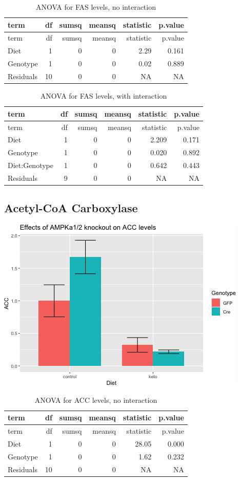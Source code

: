 \documentclass[]{article}
\begin{document}
\begin{longtable}[]{@{}lrrrrr@{}}
\caption{ANOVA for FAS levels, no interaction}\tabularnewline
\toprule
term & df & sumsq & meansq & statistic & p.value\tabularnewline
\midrule
\endfirsthead
\toprule
term & df & sumsq & meansq & statistic & p.value\tabularnewline
\midrule
\endhead
Diet & 1 & 0 & 0 & 2.29 & 0.161\tabularnewline
Genotype & 1 & 0 & 0 & 0.02 & 0.889\tabularnewline
Residuals & 10 & 0 & 0 & NA & NA\tabularnewline
\bottomrule
\end{longtable}

\begin{longtable}[]{@{}lrrrrr@{}}
\caption{ANOVA for FAS levels, with interaction}\tabularnewline
\toprule
term & df & sumsq & meansq & statistic & p.value\tabularnewline
\midrule
\endfirsthead
\toprule
term & df & sumsq & meansq & statistic & p.value\tabularnewline
\midrule
\endhead
Diet & 1 & 0 & 0 & 2.209 & 0.171\tabularnewline
Genotype & 1 & 0 & 0 & 0.020 & 0.892\tabularnewline
Diet:Genotype & 1 & 0 & 0 & 0.642 & 0.443\tabularnewline
Residuals & 9 & 0 & 0 & NA & NA\tabularnewline
\bottomrule
\end{longtable}

\hypertarget{acetyl-coa-carboxylase}{%
\subsection{Acetyl-CoA Carboxylase}\label{acetyl-coa-carboxylase}}

\includegraphics{figures/acc-barplot-1.png}

\begin{longtable}[]{@{}lrrrrr@{}}
\caption{ANOVA for ACC levels, no interaction}\tabularnewline
\toprule
term & df & sumsq & meansq & statistic & p.value\tabularnewline
\midrule
\endfirsthead
\toprule
term & df & sumsq & meansq & statistic & p.value\tabularnewline
\midrule
\endhead
Diet & 1 & 0 & 0 & 28.05 & 0.000\tabularnewline
Genotype & 1 & 0 & 0 & 1.62 & 0.232\tabularnewline
Residuals & 10 & 0 & 0 & NA & NA\tabularnewline
\bottomrule
\end{longtable}
\end{document}
